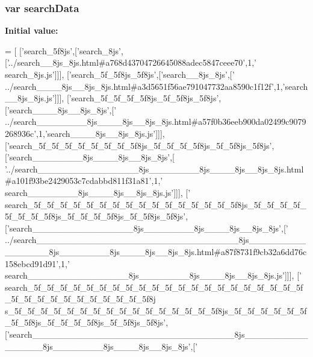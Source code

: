 \subsubsection[{search\+Data}]{\setlength{\rightskip}{0pt plus 5cm}var search\+Data}\label{variables__11_8js_ad01a7523f103d6242ef9b0451861231e}
{\bfseries Initial value\+:}
\begin{DoxyCode}
=
[
  [\textcolor{stringliteral}{'search\_5f8js'},[\textcolor{stringliteral}{'search\_8js'},[\textcolor{stringliteral}{'../search\_\_8js\_8js.html#a768d43704726645088adec5847ceee70'},1,\textcolor{stringliteral}{'
      search\_8js.js'}]]],
  [\textcolor{stringliteral}{'search\_5f\_5f8js\_5f8js'},[\textcolor{stringliteral}{'search\_\_8js\_8js'},[\textcolor{stringliteral}{'
      ../search\_\_\_\_8js\_\_8js\_8js.html#a3d5651f56ae791047732aa8590c1f12f'},1,\textcolor{stringliteral}{'search\_\_8js\_8js.js'}]]],
  [\textcolor{stringliteral}{'search\_5f\_5f\_5f\_5f8js\_5f\_5f8js\_5f8js'},[\textcolor{stringliteral}{'search\_\_\_\_8js\_\_8js\_8js'},[\textcolor{stringliteral}{'
      ../search\_\_\_\_\_\_\_\_8js\_\_\_\_8js\_\_8js\_8js.html#a57f0b36eeb900da02499c9079268936c'},1,\textcolor{stringliteral}{'search\_\_\_\_8js\_\_8js\_8js.js'}]]],
  [\textcolor{stringliteral}{'search\_5f\_5f\_5f\_5f\_5f\_5f\_5f\_5f8js\_5f\_5f\_5f\_5f8js\_5f\_5f8js\_5f8js'},[\textcolor{stringliteral}{'search\_\_\_\_\_\_\_\_8js\_\_\_\_8js\_\_8js\_8js'},[\textcolor{stringliteral}{
      '../search\_\_\_\_\_\_\_\_\_\_\_\_\_\_\_\_8js\_\_\_\_\_\_\_\_8js\_\_\_\_8js\_\_8js\_8js.html#a101f93be2429053c7cdabbd811f31a81'},1,\textcolor{stringliteral}{'
      search\_\_\_\_\_\_\_\_8js\_\_\_\_8js\_\_8js\_8js.js'}]]],
  [\textcolor{stringliteral}{'
      search\_5f\_5f\_5f\_5f\_5f\_5f\_5f\_5f\_5f\_5f\_5f\_5f\_5f\_5f\_5f\_5f8js\_5f\_5f\_5f\_5f\_5f\_5f\_5f\_5f8js\_5f\_5f\_5f\_5f8js\_5f\_5f8js\_5f8js'},[\textcolor{stringliteral}{'search\_\_\_\_\_\_\_\_\_\_\_\_\_\_\_\_8js\_\_\_\_\_\_\_\_8js\_\_\_\_8js\_\_8js\_8js'},[\textcolor{stringliteral}{'
      ../search\_\_\_\_\_\_\_\_\_\_\_\_\_\_\_\_\_\_\_\_\_\_\_\_\_\_\_\_\_\_\_\_8js\_\_\_\_\_\_\_\_\_\_\_\_\_\_\_\_8js\_\_\_\_\_\_\_\_8js\_\_\_\_8js\_\_8js\_8js.html#a87f8731f9cb32a6dd76c158ebcd91d91'},1,\textcolor{stringliteral}{'
      search\_\_\_\_\_\_\_\_\_\_\_\_\_\_\_\_8js\_\_\_\_\_\_\_\_8js\_\_\_\_8js\_\_8js\_8js.js'}]]],
  [\textcolor{stringliteral}{'
      search\_5f\_5f\_5f\_5f\_5f\_5f\_5f\_5f\_5f\_5f\_5f\_5f\_5f\_5f\_5f\_5f\_5f\_5f\_5f\_5f\_5f\_5f\_5f\_5f\_5f\_5f\_5f\_5f\_5f\_5f\_5f\_5f8j
      s\_5f\_5f\_5f\_5f\_5f\_5f\_5f\_5f\_5f\_5f\_5f\_5f\_5f\_5f\_5f\_5f8js\_5f\_5f\_5f\_5f\_5f\_5f\_5f\_5f8js\_5f\_5f\_5f\_5f8js\_5f\_5f8js\_5f8js'},[\textcolor{stringliteral}{'search\_\_\_\_\_\_\_\_\_\_\_\_\_\_\_\_\_\_\_\_\_\_\_\_\_\_\_\_\_\_\_\_8js\_\_\_\_\_\_\_\_\_\_\_\_\_\_\_\_8js\_\_\_\_\_\_\_\_8js\_\_\_\_8js\_\_8js\_8js'},[\textcolor{stringliteral}{'
}
\end{DoxyCode}
